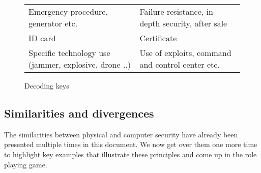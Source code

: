 \documentclass[11pt]{article} %
\begin{document}
\begin{figure}
\begin{tabularx}{\textwidth}{|X|X|}
Emergency procedure, generator etc. & Failure resistance, in-depth security, after sale \\
ID card & Certificate \\
Specific technology use (jammer, explosive, drone ..) &
Use of exploits, command and control center etc. \\ \hline
    \end{tabularx}
    \caption{Decoding keys}
\end{figure}

%
\subsection{Similarities and divergences}
The similarities between physical and computer security have already 
been presented multiple times in this document. We now get over them one 
more time to highlight key examples that illustrate these principles and come up 
in the role playing game.

\end{document}
